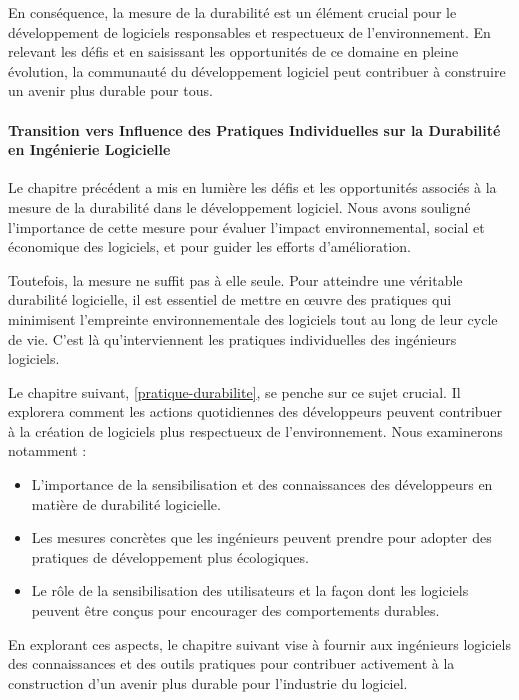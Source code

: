 En conséquence, la mesure de la durabilité est un élément crucial pour le développement de logiciels responsables et respectueux de l'environnement. En relevant les défis et en saisissant les opportunités de ce domaine en pleine évolution, la communauté du développement logiciel peut contribuer à construire un avenir plus durable pour tous.

\paragraph{Transition vers Influence des Pratiques Individuelles sur la Durabilité en Ingénierie Logicielle}
Le chapitre précédent a mis en lumière les défis et les opportunités associés à la mesure de la durabilité dans le développement logiciel. Nous avons souligné l'importance de cette mesure pour évaluer l'impact environnemental, social et économique des logiciels, et pour guider les efforts d'amélioration.

Toutefois, la mesure ne suffit pas à elle seule. Pour atteindre une véritable durabilité logicielle, il est essentiel de mettre en œuvre des pratiques qui minimisent l'empreinte environnementale des logiciels tout au long de leur cycle de vie. C'est là qu'interviennent les pratiques individuelles des ingénieurs logiciels.

Le chapitre suivant, \ref{pratique-durabilite}, se penche sur ce sujet crucial. Il explorera comment les actions quotidiennes des développeurs peuvent contribuer à la création de logiciels plus respectueux de l'environnement. Nous examinerons notamment :

\begin{itemize}
    \item L'importance de la sensibilisation et des connaissances des développeurs en matière de durabilité logicielle.
    \item Les mesures concrètes que les ingénieurs peuvent prendre pour adopter des pratiques de développement plus écologiques.
    \item Le rôle de la sensibilisation des utilisateurs et la façon dont les logiciels peuvent être conçus pour encourager des comportements durables.
\end{itemize}

En explorant ces aspects, le chapitre suivant vise à fournir aux ingénieurs logiciels des connaissances et des outils pratiques pour contribuer activement à la construction d'un avenir plus durable pour l'industrie du logiciel.